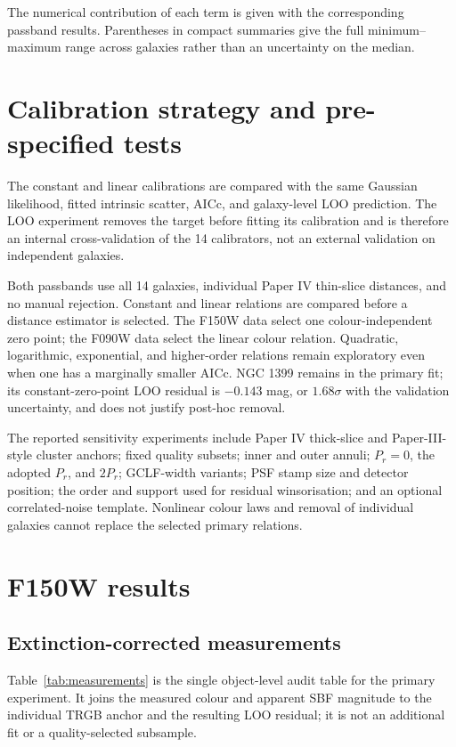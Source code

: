 \documentclass[nodoi,nocopyright]{pas}
\begin{document}
The numerical contribution of each term is given with the corresponding
passband results. Parentheses in compact summaries give the full
minimum--maximum range across galaxies rather than an uncertainty on the
median.

\section{Calibration strategy and pre-specified tests}

The constant and linear calibrations are compared with the same Gaussian
likelihood, fitted intrinsic scatter, AICc, and galaxy-level LOO prediction.
The LOO experiment removes the target before fitting its calibration and is
therefore an internal cross-validation of the 14 calibrators, not an external
validation on independent galaxies.

Both passbands use all 14 galaxies, individual Paper IV thin-slice distances,
and no manual rejection.  Constant and linear relations are compared before a
distance estimator is selected.  The F150W data select one colour-independent
zero point; the F090W data select the linear colour relation.  Quadratic,
logarithmic, exponential, and higher-order relations remain exploratory even
when one has a marginally smaller AICc.
NGC 1399 remains in the primary fit; its constant-zero-point LOO residual is
$-0.143$ mag, or $1.68\sigma$ with the validation uncertainty, and does not
justify post-hoc removal.

The reported sensitivity experiments include Paper IV thick-slice and
Paper-III-style cluster anchors; fixed quality subsets; inner and outer
annuli; $P_r=0$, the adopted $P_r$, and $2P_r$; GCLF-width variants; PSF stamp
size and detector position; the order and support used for residual
winsorisation; and an optional correlated-noise template. Nonlinear colour
laws and removal of individual galaxies cannot replace the selected primary
relations.

\section{F150W results}
\label{sec:f150-results}

\subsection{Extinction-corrected measurements}

Table~\ref{tab:measurements} is the single object-level audit table for the
primary experiment. It joins the measured colour and apparent SBF magnitude to
the individual TRGB anchor and the resulting LOO residual; it is not an
additional fit or a quality-selected subsample.
\end{document}
